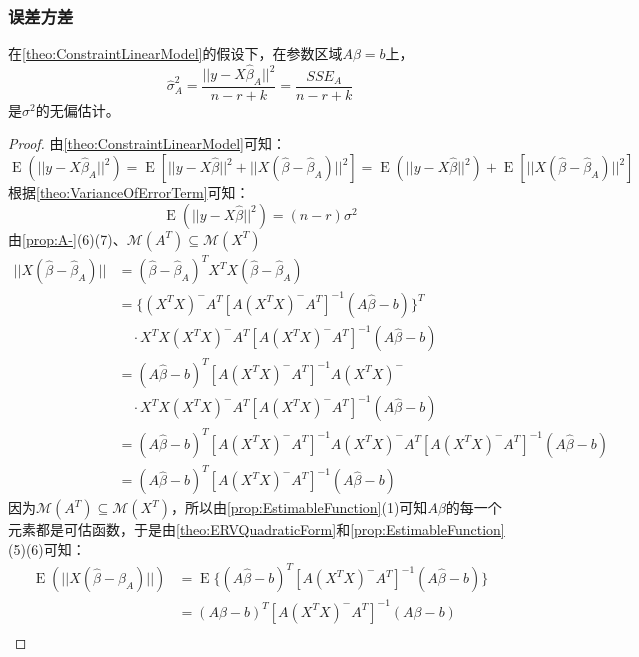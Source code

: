 \subsubsection{误差方差}
\begin{theorem}
	在\cref{theo:ConstraintLinearModel}的假设下，在参数区域$A\beta=b$上，
	\begin{equation*}
		\hat{\sigma}_A^2=\frac{||y-X\hat{\beta}_A||^2}{n-r+k}=\frac{SSE_A}{n-r+k}
	\end{equation*}
	是$\sigma^2$的无偏估计。
\end{theorem}
\begin{proof}
	由\cref{theo:ConstraintLinearModel}可知：
	\begin{equation*}
		\operatorname{E}(||y-X\hat{\beta}_A||^2)=\operatorname{E}[||y-X\hat{\beta}||^2+||X(\hat{\beta}-\hat{\beta}_A)||^2]=\operatorname{E}(||y-X\hat{\beta}||^2)+\operatorname{E}[||X(\hat{\beta}-\hat{\beta}_A)||^2]
	\end{equation*}
	根据\cref{theo:VarianceOfErrorTerm}可知：
	\begin{equation*}
		\operatorname{E}(||y-X\hat{\beta}||^2)=(n-r)\sigma^2
	\end{equation*}
	由\cref{prop:A-}(6)(7)、$\mathcal{M}(A^T)\subseteq\mathcal{M}(X^T)$
	\begin{align*}
		||X(\hat{\beta}-\hat{\beta}_A)||&=(\hat{\beta}-\hat{\beta}_A)^TX^TX(\hat{\beta}-\hat{\beta}_A) \\
		&=\{(X^TX)^-A^T[A(X^TX)^-A^T]^{-1}(A\hat{\beta}-b)\}^T \\
		&\quad\cdot X^TX(X^TX)^-A^T[A(X^TX)^-A^T]^{-1}(A\hat{\beta}-b) \\
		&=(A\hat{\beta}-b)^T[A(X^TX)^-A^T]^{-1}A(X^TX)^- \\
		&\quad\cdot X^TX(X^TX)^-A^T[A(X^TX)^-A^T]^{-1}(A\hat{\beta}-b) \\
		&=(A\hat{\beta}-b)^T[A(X^TX)^-A^T]^{-1}A(X^TX)^-A^T[A(X^TX)^-A^T]^{-1}(A\hat{\beta}-b) \\
		&=(A\hat{\beta}-b)^T[A(X^TX)^-A^T]^{-1}(A\hat{\beta}-b)
	\end{align*}
	因为$\mathcal{M}(A^T)\subseteq\mathcal{M}(X^T)$，所以由\cref{prop:EstimableFunction}(1)可知$A\beta$的每一个元素都是可估函数，于是由\cref{theo:ERVQuadraticForm}和\cref{prop:EstimableFunction}(5)(6)可知：
	\begin{align*}
		\operatorname{E}(||X(\hat{\beta}-\hat{\beta}_A)||)
		&=\operatorname{E}\{(A\hat{\beta}-b)^T[A(X^TX)^-A^T]^{-1}(A\hat{\beta}-b)\} \\
		&=(A\beta-b)^T[A(X^TX)^-A^T]^{-1}(A\beta-b) \\

\end{align*}
\end{proof}

